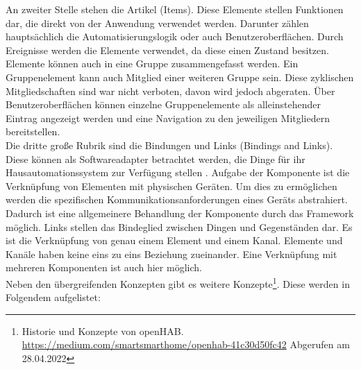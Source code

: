     An zweiter Stelle stehen die Artikel (Items). Diese Elemente stellen Funktionen dar, die direkt von der Anwendung verwendet 
    werden. Darunter zählen hauptsächlich die Automatisierungslogik oder auch Benutzeroberflächen. Durch Ereignisse werden die 
    Elemente verwendet, da diese einen Zustand besitzen. 
    Elemente können auch in eine Gruppe zusammengefasst werden. Ein Gruppenelement kann auch Mitglied einer weiteren Gruppe sein. 
    Diese zyklischen Mitgliedschaften sind war nicht verboten, davon wird jedoch abgeraten. Über Benutzeroberflächen können 
    einzelne Gruppenelemente als alleinstehender Eintrag angezeigt werden und eine Navigation zu den jeweiligen Mitgliedern 
    bereitstellen. 
    \\
    \linebreak
    Die dritte große Rubrik sind die Bindungen und Links (Bindings and Links). Diese können als Softwareadapter betrachtet werden, 
    die Dinge für ihr Hausautomationssystem zur Verfügung stellen \cite{openHAB-article}. Aufgabe der Komponente ist die Verknüpfung 
    von Elementen mit physischen Geräten. Um dies zu ermöglichen werden die spezifischen Kommunikationsanforderungen eines Geräts 
    abstrahiert. Dadurch ist eine allgemeinere Behandlung der Komponente durch das Framework möglich. Links stellen das Bindeglied 
    zwischen Dingen und Gegenständen dar. Es ist die Verknüpfung von genau einem Element und einem Kanal. Elemente und 
    Kanäle haben keine eins zu eins Beziehung zueinander. Eine Verknüpfung mit mehreren Komponenten ist auch hier möglich. 
    \\
    Neben den übergreifenden Konzepten gibt es weitere Konzepte\footnote{Historie und Konzepte von openHAB. \url{https://medium.com/smartsmarthome/openhab-41c30d50fc42} Abgerufen am 28.04.2022}. 
    Diese werden in Folgendem aufgelistet:
